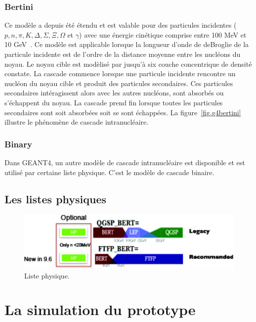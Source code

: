 \subsubsection{Bertini}
Ce modèle a depuis été étendu et est valable pour des particules incidentes ($p,n,\pi,K,\Delta,\Sigma,\Xi,\Omega$ et $\gamma$) avec une énergie cinétique comprise entre 100 MeV et 10 GeV~\cite{geant4_bertini}. Ce modèle est applicable lorsque la longueur d'onde de deBroglie de la particule incidente est de l'ordre de la distance moyenne entre les nucléons du noyau. Le noyau cible est modèlisé par jusqu'à six couche concentrique de densité constate. La cascade commence lorsque une particule incidente rencontre un nucléon du noyau cible et produit des particules secondaires. Ces particules secondaires intéragissent alors avec les autres nucléons, sont absorbés ou s'échappent du noyau. La cascade prend fin lorsque toutes les particules secondaires sont soit absorbées soit se sont échappées. La figure~\ref{fig.g4bertini} illustre le phénomène de cascade intranucléaire.
\subsubsection{Binary}
Dans GEANT4, un autre modèle de cascade intranucléaire est disponible et est utilisé par certaine liste physique. C'est le modèle de cascade binaire. 
\subsection{Les listes physiques}
\label{sec.listphys}
\begin{figure}[!ht]
  \begin{center}
    \includegraphics[width=.8\textwidth]{Digitizer/figs/physics_list_G4.pdf}
    \caption{Liste physique.}
    \label{fig.g4list}
  \end{center}
\end{figure}


\section{La simulation du prototype}

